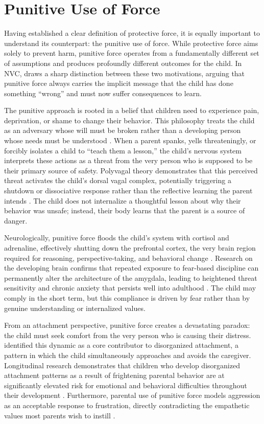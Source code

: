 \section{Punitive Use of Force}

Having established a clear definition of protective force, it is equally important to understand its counterpart: the punitive use of force.
While protective force aims solely to prevent harm, punitive force operates from a fundamentally different set of assumptions and produces profoundly different outcomes for the child.
In NVC, \citet{rosenberg2003} draws a sharp distinction between these two motivations, arguing that punitive force always carries the implicit message that the child has done something ``wrong'' and must now suffer consequences to learn.

The punitive approach is rooted in a belief that children need to experience pain, deprivation, or shame to change their behavior.
This philosophy treats the child as an adversary whose will must be broken rather than a developing person whose needs must be understood \citep{kohn2005}.
When a parent spanks, yells threateningly, or forcibly isolates a child to ``teach them a lesson,'' the child's nervous system interprets these actions as a threat from the very person who is supposed to be their primary source of safety.
Polyvagal theory demonstrates that this perceived threat activates the child's dorsal vagal complex, potentially triggering a shutdown or dissociative response rather than the reflective learning the parent intends \citep{porges2011}.
The child does not internalize a thoughtful lesson about why their behavior was unsafe; instead, their body learns that the parent is a source of danger.

Neurologically, punitive force floods the child's system with cortisol and adrenaline, effectively shutting down the prefrontal cortex, the very brain region required for reasoning, perspective-taking, and behavioral change \citep{lupien2009}.
Research on the developing brain confirms that repeated exposure to fear-based discipline can permanently alter the architecture of the amygdala, leading to heightened threat sensitivity and chronic anxiety that persists well into adulthood \citep{tottenham2012}.
The child may comply in the short term, but this compliance is driven by fear rather than by genuine understanding or internalized values.

From an attachment perspective, punitive force creates a devastating paradox: the child must seek comfort from the very person who is causing their distress.
\citet{bowlby1969} identified this dynamic as a core contributor to disorganized attachment, a pattern in which the child simultaneously approaches and avoids the caregiver.
Longitudinal research demonstrates that children who develop disorganized attachment patterns as a result of frightening parental behavior are at significantly elevated risk for emotional and behavioral difficulties throughout their development \citep{sroufe2005}.
Furthermore, parental use of punitive force models aggression as an acceptable response to frustration, directly contradicting the empathetic values most parents wish to instill \citep{siegel2003}.

